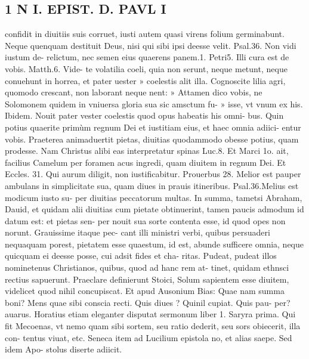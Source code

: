 \documentclass{article}
\begin{document}
\begin{pages}
\section*{1 N I. EPIST. D. PAVL I }
\marginpar{[ p.124 ]}\pstart confidit in diuitiis suis corruet, iusti autem quasi virens folium germinabunt. Neque quenquam destituit Deus, nisi qui sibi ipsi deesse velit. Psal.36. Non vidi iustum de-  relictum, nec semen eius quaerens panem.1. Petri5. Illi cura est de vobis. Matth.6. Vide-  te volatilia coeli, quia non serunt, neque metunt, neque conuehunt in horrea, et pater uester » coelestis alit illa. Cognoscite lilia agri, quomodo crescant, non laborant neque nent: » Attamen dico vobis, ne Solomonem quidem in vniuersa gloria sua sic amsctum fu- » isse, vt vnum ex his. Ibidem. Nouit pater vester coelestis quod opus habeatis his omni-  bus. Quin potius quaerite primùm regnum Dei et iustitiam eius, et haec omnia adiici- entur vobis. Praeterea animaduertit pietas, diuitias quodammodo obesse potius, quam prodesse. Nam Christus alibi eas interpretatur spinas Luc.8. Et Marci 1o. ait, facilius Camelum per foramen acus ingredi, quam diuitem in regnum Dei. Et Eccles. 31. Qui aurum diligit, non iustificabitur. Prouerbus 28. Melior est pauper ambulans in simplicitate sua, quam diues in prauis itineribus. Psal.36.Melius est modicum iusto su- per diuitias peccatorum multas. In summa, tametsi Abraham, Dauid, et quidam alii diuitias cum pietate obtinuerint, tamen paucis admodum id datum est: et pietas sen- per nouit sua sorte contenta esse, id quod opes non norunt. Grauissime itaque pec- cant illi ministri verbi, quibus persuaderi nequaquam porest, pietatem esse quaestum, id est, abunde sufficere omnia, neque quicquam ei deesse posse, cui adsit fides et cha- ritas. Pudeat, pudeat illos nominetenus Christianos, quibus, quod ad hanc rem at- tinet, quidam ethnsci rectius sapuerunt. Praeclare definierunt Stoici, Solum sapientem esse diuitem, videlicet quod nihil concupiscat. Et apud Ausonium Bias: Quae nam summa boni? Mens quae sibi conscia recti. Quis diues ? Quinil cupiat. Quis pau- per? auarus. Horatius etiam eleganter disputat sermonum liber 1. Saryra prima. Qui fit Mecoenas, vt nemo quam sibi sortem, seu ratio dederit, seu sors obiecerit, illa con- tentus viuat, etc. Seneca item ad Lucilium epistola no, et alias saepe. Sed idem Apo- stolus diserte adiicit.  \pend
{}
{}

\end{pages}
\end{document}
